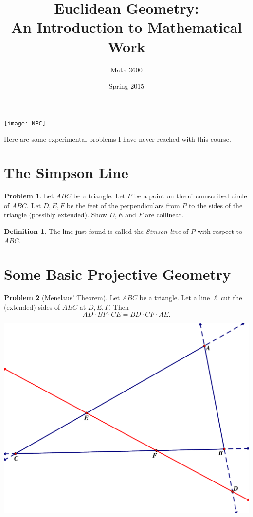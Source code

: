\documentclass{tufte-handout}
\title{Euclidean Geometry:\\An Introduction to Mathematical Work}
\author[]{Math 3600}
\date{Spring 2015}
\theoremstyle{definition}
\newtheorem{problem}{Problem}[section]
\newtheorem*{definition}{Definition}
\begin{document}
\maketitle

\begin{marginfigure}
    \texttt{[image: NPC]}
\end{marginfigure}

\vspace{.5in}
Here are some experimental problems I have never reached with this course.

\setcounter{section}{19}
\section{The Simpson Line}

\begin{problem}\label{prob:Simson-line}
Let $ABC$ be a triangle. Let $P$ be a point on the circumscribed circle of $ABC$. Let $D, E, F$ be the feet of the perpendiculars from $P$ to the sides of the triangle (possibly extended). Show $D, E$ and $F$ are collinear.
\end{problem}

\begin{definition}\label{defn:Simson-line}
The line just found is called the \emph{Simson line} of $P$ with respect to $ABC$.
\end{definition}


\section{Some Basic Projective Geometry}

\begin{problem}[Menelaus' Theorem]\label{prob:Menelaus-theorem}
Let $ABC$ be a triangle. Let a line $\ell$ cut the (extended) sides of $ABC$ at $D, E, F$. Then
\[ AD\cdot BF \cdot CE = BD \cdot CF \cdot AE .\]
\end{problem}


\begin{center}
\includegraphics[scale=.25]{Menelaus.pdf}
\end{center}
\end{document}
